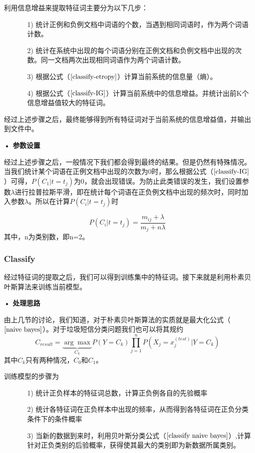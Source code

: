 \documentclass[a4paper,11pt,twoside,openany]{article}
\begin{document}
\begin{CJK*}{UTF8}{gbsn}
利用信息增益来提取特征词主要分为以下几步：
\begin{enumerate}
\item[]
\begin{enumerate}
	\item[1)] 统计正例和负例文档中词语的个数，当遇到相同词语时，作为两个词语计数。
	\item[2)] 统计在系统中出现的每个词语分别在正例文档和负例文档中出现的次数。同一文档两次出现相同词语作为两个词语计数。
	\item[3)] 根据公式（$\ref{classify-etropy}$）计算当前系统的信息量（熵）。
	\item[4)] 根据公式（$\ref{classify-IG}$）计算当前系统中的信息增益。并统计出前K个信息增益值较大的特征词。
\end{enumerate}
\end{enumerate}

经过上述步骤之后，最终能够得到所有特征词对于当前系统的信息增益值，并输出到文件中。

\textbf{• 参数设置}

经过上述步骤之后，一般情况下我们都会得到最终的结果。但是仍然有特殊情况。当我们统计某个词语在正例文档中出现的次数为0时，那么根据公式（$\ref{classify-IG}$）可得，$P(C_1|t = t_j)$为0，就会出现错误。为防止此类错误的发生，我们设置参数$\lambda$进行拉普拉斯平滑，即在统计每个词语在正负例文档中出现的频次时，同时加入参数$\lambda$。所以在计算$P(C_i|t = t_j)$时

\begin{equation}
P(C_i|t = t_j) = \frac{m_{ij}+\lambda}{m_j+n\lambda}
\end{equation}
其中，n为类别数，即n=2。

\subsubsection{Classify}

经过特征词的提取之后，我们可以得到训练集中的特征词。接下来就是利用朴素贝叶斯算法来训练当前模型。

\textbf{• 处理思路}

由上几节的讨论，我们知道，对于朴素贝叶斯算法的实质就是最大化公式（$\ref{naive bayes}$）。对于垃圾短信分类问题我们也可以将其规约
\begin{equation}\label{classify naive bayes}
C_{result} = \underbrace{\arg\max}_{C_k}P(Y=C_k)\prod_{j=1}^nP(X_j=x_j^{(test)}|Y = C_k)
\end{equation}
其中$C_k$只有两种情况，$C_0$和$C_1$。

训练模型的步骤为
\begin{enumerate}
\item[]
\begin{enumerate}
\item[1)] 统计正负样本的特征词总数，计算正负例各自的先验概率
\item[2)] 统计各特征词在正负样本中出现的频率，从而得到各特征词在正负分类条件下的条件概率
\item[3)] 当新的数据到来时，利用贝叶斯分类公式（$\ref{classify naive bayes}$）,计算针对正负类别的后验概率，获得使其最大的类别即为新数据所属类别。
\end{enumerate}
\end{enumerate}


\end{CJK*}
\end{document}
